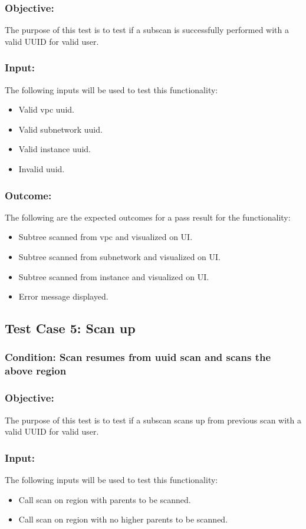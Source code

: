 \documentclass[hidelinks,a4paper,12pt]{article}
\begin{document}
\subsubsection{Objective:} The purpose of this test is to test if a subscan is successfully performed with a valid UUID for valid user.

\subsubsection{Input:}
 The following inputs will be used to test this functionality:
\begin{itemize}
  \item Valid vpc uuid.
  \item Valid subnetwork uuid.
 \item Valid instance uuid.
\item Invalid uuid.

\end{itemize}

\subsubsection{Outcome: }
The following are the expected outcomes for a pass result for the functionality:
\begin{itemize}
\item Subtree scanned from vpc and visualized on UI.
\item Subtree scanned from subnetwork and visualized on UI.
\item Subtree scanned from instance and visualized on UI.
\item Error message displayed.
\end{itemize}


\subsection{Test Case 5: Scan up }
\subsubsection{Condition: Scan resumes from uuid scan and scans the above region}
\subsubsection{Objective:} The purpose of this test is to test if a subscan scans up from previous scan with a valid UUID for valid user.

\subsubsection{Input:}
 The following inputs will be used to test this functionality:
\begin{itemize}
  \item Call scan on region with parents to be scanned.
   \item Call scan on region with no higher parents to be scanned.

\end{itemize}
\end{document}
